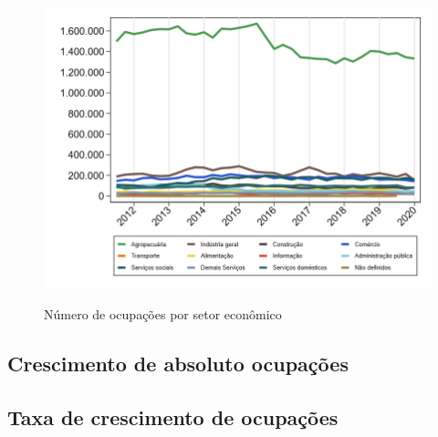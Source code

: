 \documentclass[10pt]{beamer}
\begin{document}
\begin{frame}
\textit{\hyperlink{indice_principal_amz_rural}{}}
\begin{figure}
  \centering
  \includegraphics[width=.85\linewidth]{./../analysis/output/_amz_rural_importancia_relativa.png}
  \label{_amz_rural_importancia_relativa}
  \caption{{Número de ocupações por setor econômico}}
\end{figure}
\end{frame}

\subsection{Crescimento de absoluto ocupações}

\begin{frame}
\textit{\hyperlink{indice_principal_amz_rural}{}}

\end{frame}


\begin{frame}
\textit{\hyperlink{indice_principal_amz_rural}{}}

\end{frame}


\begin{frame}
\textit{\hyperlink{indice_principal_amz_rural}{}}

\end{frame}

\subsection{Taxa de crescimento de ocupações}
\end{document}

